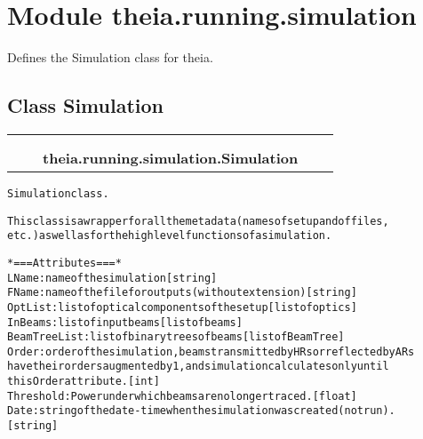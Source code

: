 %
%
%


\section{Module theia.running.simulation}

    \label{theia:running:simulation}
Defines the Simulation class for theia.



\subsection{Class Simulation}

    \label{theia:running:simulation:Simulation}
\begin{tabular}{cccccc}
\multicolumn{2}{r}{\settowidth{\BCL}{object}\multirow{2}{\BCL}{object}}
&&
  \\\cline{3-3}
  &&\multicolumn{1}{c|}{}
&&
  \\
&&\multicolumn{2}{l}{\textbf{theia.running.simulation.Simulation}}
\end{tabular}

\begin{alltt}


Simulation class.

This class is a wrapper for all the metadata (names of setup and of files,
etc.) as well as for the high level functions of a simulation.

*=== Attributes ===*
LName: name of the simulation [string]
FName: name of the file for outputs (without extension) [string]
OptList: list of optical components of the setup [list of optics]
InBeams: list of input beams [list of beams]
BeamTreeList: list of binary trees of beams [list of BeamTree]
Order: order of the simulation, beams transmitted by HRs or reflected by ARs
    have their orders augmented by 1, and simulation calculates only until
    this Order attribute. [int]
Threshold: Power under which beams are no longer traced. [float]
Date: string of the date-time when the simulation was created (not run).
    [string]
\end{alltt}


